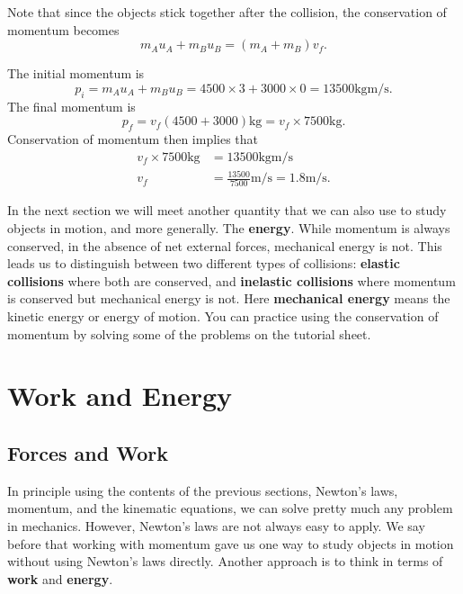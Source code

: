 \documentclass[a4paper,12pt]{book}
\begin{document}
Note that since the objects stick together after the collision, the conservation of momentum becomes
\begin{equation*}
m_{A}u_{A}+m_{B}u_{B}=(m_{A}+m_{B})v_{f}.
\end{equation*}

The initial momentum is
\begin{equation*}
p_{i}=m_{A}u_{A}+m_{B}u_{B}=4500\times 3+3000\times 0=13500\text{kgm/s}.
\end{equation*}
The final momentum is
\begin{equation*}
p_{f}=v_{f}(4500+3000) \text{kg} =v_{f}\times 7500\text{kg}.
\end{equation*}
Conservation of momentum then implies that
\begin{align*}
v_{f}\times 7500\text{kg}&=13500\text{kgm/s}\\
v_{f}&=\frac{13500}{7500}\text{m/s}=1.8\text{m/s}.
\end{align*}

In the next section we will meet another quantity that we can also use to study objects in motion, and more generally. The \textbf{energy}.  While momentum is always conserved, in the absence of net external forces, mechanical energy is not. This leads us to distinguish between two different types of collisions: \textbf{elastic collisions} where both are conserved, and \textbf{inelastic collisions} where momentum is conserved but mechanical energy is not. Here \textbf{mechanical energy} means the kinetic energy or energy of motion. You can practice using the conservation of momentum by solving some of the problems on the tutorial sheet.



\chapter{Work and Energy}
\label{sec: work and energy}

\section{Forces and Work}
In principle using the contents of the previous sections, Newton's laws, momentum, and the kinematic equations, we can solve pretty much any problem in mechanics. However, Newton's laws are not always easy to apply. We say before that working with momentum gave us one way to study objects in motion without using Newton's laws directly. Another approach is to think in terms of \textbf{work} and \textbf{energy}.\\
\end{document}
